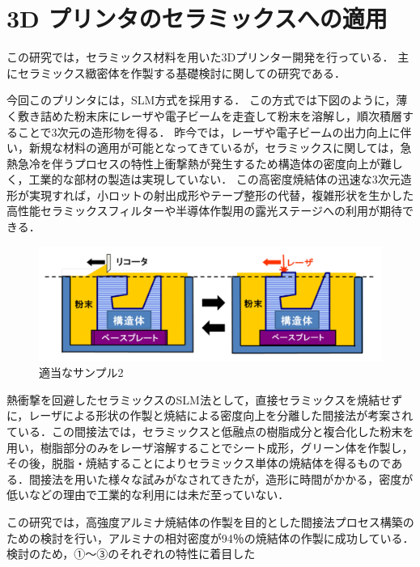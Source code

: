 \section{3D プリンタのセラミックスへの適用\cite{g}}
\label{sec:enum}
この研究では，セラミックス材料を用いた3Dプリンター開発を行っている．
主にセラミックス緻密体を作製する基礎検討に関しての研究である．

今回このプリンタには，SLM方式を採用する．
この方式では下図のように，薄く敷き詰めた粉末床にレーザや電子ビームを走査して粉末を溶解し，順次積層することで3次元の造形物を得る．
昨今では，レーザや電子ビームの出力向上に伴い，新規な材料の適用が可能となってきているが，セラミックスに関しては，急熱急冷を伴うプロセスの特性上衝撃熱が発生するため構造体の密度向上が難しく，工業的な部材の製造は実現していない．
この高密度焼結体の迅速な3次元造形が実現すれば，小ロットの射出成形やテープ整形の代替，複雑形状を生かした高性能セラミックスフィルターや半導体作製用の露光ステージへの利用が期待できる．

\begin{figure}[H]
  \centering
  \includegraphics[width=11truecm]{./fig/セラミック.png}
  \caption{適当なサンプル2}
  \label{fig:ferret}
\end{figure}

熱衝撃を回避したセラミックスのSLM法として，直接セラミックスを焼結せずに，レーザによる形状の作製と焼結による密度向上を分離した間接法が考案されている．この間接法では，セラミックスと低融点の樹脂成分と複合化した粉末を用い，樹脂部分のみをレーザ溶解することでシート成形，グリーン体を作製し，その後，脱脂・焼結することによりセラミックス単体の焼結体を得るものである．間接法を用いた様々な試みがなされてきたが，造形に時間がかかる，密度が低いなどの理由で工業的な利用には未だ至っていない．

この研究では，高強度アルミナ焼結体の作製を目的とした間接法プロセス構築のための検討を行い，アルミナの相対密度が94％の焼結体の作製に成功している．
検討のため，①～③のそれぞれの特性に着目した

